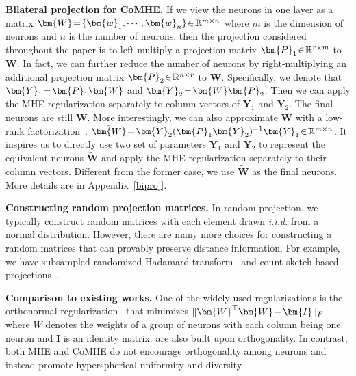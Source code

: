 \textbf{Bilateral projection for CoMHE.} If we view the neurons in one layer as a matrix $\thickmuskip=2mu \medmuskip=2mu \bm{W}=\{\bm{w}_1,\cdots,\bm{w}_n\}\in\mathbb{R}^{m\times n}$ where $m$ is the dimension of neurons and $n$ is the number of neurons, then the projection considered throughout the paper is to left-multiply a projection matrix $\thickmuskip=2mu \medmuskip=2mu \bm{P}_1\in\mathbb{R}^{r\times m}$ to $\bm{W}$. In fact, we can further reduce the number of neurons by right-multiplying an additional projection matrix $\thickmuskip=2mu \medmuskip=2mu \bm{P}_2\in\mathbb{R}^{n\times r}$ to $\bm{W}$. Specifically, we denote that $\thickmuskip=2mu \medmuskip=2mu \bm{Y}_1=\bm{P}_1\bm{W}$ and $\thickmuskip=2mu \medmuskip=2mu \bm{Y}_2=\bm{W}\bm{P}_2$. Then we can apply the MHE regularization separately to column vectors of $\bm{Y}_1$ and $\bm{Y}_2$. The final neurons are still $\bm{W}$. More interestingly, we can also approximate $\bm{W}$ with a low-rank factorization~\cite{zhou2011godec}: $\thickmuskip=2mu \medmuskip=2mu \tilde{\bm{W}}= \bm{Y}_2(\bm{P}_1\bm{Y}_2)^{-1}\bm{Y}_1\in\mathbb{R}^{m\times n}$. It inspires us to directly use two set of parameters $\bm{Y}_1$ and $\bm{Y}_2$ to represent the equivalent neurons $\tilde{\bm{W}}$ and apply the MHE regularization separately to their column vectors. Different from the former case, we use $\tilde{\bm{W}}$ as the final neurons. More details are in Appendix~\ref{biproj}.

\textbf{Constructing random projection matrices.} In random projection, we typically construct random matrices with each element drawn \emph{i.i.d.} from a normal distribution. However, there are many more choices for constructing a random matrices that can provably preserve distance information. For example, we have subsampled randomized Hadamard transform~\cite{ailon2006approximate} and count sketch-based projections~\cite{charikar2004finding}.

\textbf{Comparison to existing works.} One of the widely used regularizations is the orthonormal regularization~\cite{liu2017hyper,brock2016neural} that minimizes $\thickmuskip=2mu \medmuskip=2mu \|\bm{W}^\top\bm{W}-\bm{I}\|_F$ where $W$ denotes the weights of a group of neurons with each column being one neuron and $\bm{I}$ is an identity matrix. \cite{bansal2018can,rodriguez2017regularizing} are also built upon orthogonality. In contrast, both MHE and CoMHE do not encourage orthogonality among neurons and instead promote hyperspherical uniformity and diversity. 
\par

